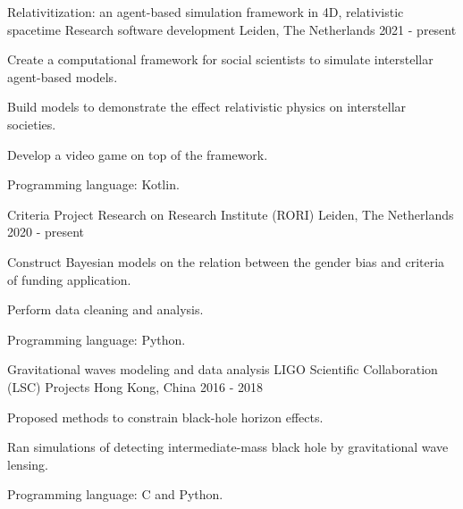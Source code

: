 

\begin{cventries}

  \cventry
    {Relativitization: an agent-based simulation framework in 4D, relativistic spacetime} %
    {Research software development} %
    {Leiden, The Netherlands} %
    {2021 - present} %
    {
      \begin{cvitems} %
        \item {Create a computational framework for social scientists to simulate interstellar agent-based models.}
        \item {Build models to demonstrate the effect relativistic physics on interstellar societies.}
        \item {Develop a video game on top of the framework.}
        \item {Programming language: Kotlin.}
      \end{cvitems}
    }

  \cventry
    {Criteria Project} %
    {Research on Research Institute (RORI)} %
    {Leiden, The Netherlands} %
    {2020 - present} %
    {
      \begin{cvitems} %
        \item {Construct Bayesian models on the relation between the gender bias and criteria of funding application.}
        \item {Perform data cleaning and analysis.}
        \item {Programming language: Python.}
      \end{cvitems}
    }

  \cventry
    {Gravitational waves modeling and data analysis} %
    {LIGO Scientific Collaboration (LSC) Projects} %
    {Hong Kong, China} %
    {2016 - 2018} %
    {
      \begin{cvitems} %
        \item {Proposed methods to constrain black-hole horizon effects.}
        \item {Ran simulations of detecting intermediate-mass black hole by gravitational wave lensing.}
        \item {Programming language: C and Python.}
      \end{cvitems}
    }


\end{cventries}
